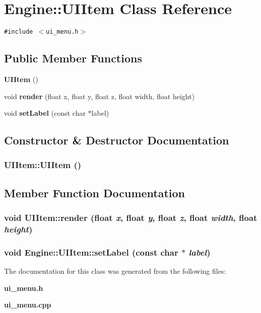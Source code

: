 \section{Engine::UIItem Class Reference}
\label{classEngine_1_1UIItem}
{\tt \#include $<$ui\_\-menu.h$>$}

\subsection*{Public Member Functions}
\begin{CompactItemize}
\item 
{\bf UIItem} ()
\item 
void {\bf render} (float x, float y, float z, float width, float height)
\item 
void {\bf setLabel} (const char $\ast$label)
\end{CompactItemize}


\subsection{Constructor \& Destructor Documentation}
\subsubsection{\setlength{\rightskip}{0pt plus 5cm}UIItem::UIItem ()}\label{classEngine_1_1UIItem_c044b18d026ce48feee1b8e70351e0fe}




\subsection{Member Function Documentation}
\subsubsection{\setlength{\rightskip}{0pt plus 5cm}void UIItem::render (float {\em x}, float {\em y}, float {\em z}, float {\em width}, float {\em height})}\label{classEngine_1_1UIItem_a8358b99b971dd315b1fc9b49490d68a}


\subsubsection{\setlength{\rightskip}{0pt plus 5cm}void Engine::UIItem::setLabel (const char $\ast$ {\em label})\hspace{0.3cm}{\tt  [inline]}}\label{classEngine_1_1UIItem_5ffbe5d793cae772a0d8bf43ac0a96e1}




The documentation for this class was generated from the following files:\begin{CompactItemize}
\item 
{\bf ui\_\-menu.h}\item 
{\bf ui\_\-menu.cpp}\end{CompactItemize}

